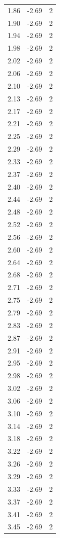 \begin{longtable}{lrr}
  1.86 & -2.69 & 2 \\
  1.90 & -2.69 & 2 \\
  1.94 & -2.69 & 2 \\
  1.98 & -2.69 & 2 \\
  2.02 & -2.69 & 2 \\
  2.06 & -2.69 & 2 \\
  2.10 & -2.69 & 2 \\
  2.13 & -2.69 & 2 \\
  2.17 & -2.69 & 2 \\
  2.21 & -2.69 & 2 \\
  2.25 & -2.69 & 2 \\
  2.29 & -2.69 & 2 \\
  2.33 & -2.69 & 2 \\
  2.37 & -2.69 & 2 \\
  2.40 & -2.69 & 2 \\
  2.44 & -2.69 & 2 \\
  2.48 & -2.69 & 2 \\
  2.52 & -2.69 & 2 \\
  2.56 & -2.69 & 2 \\
  2.60 & -2.69 & 2 \\
  2.64 & -2.69 & 2 \\
  2.68 & -2.69 & 2 \\
  2.71 & -2.69 & 2 \\
  2.75 & -2.69 & 2 \\
  2.79 & -2.69 & 2 \\
  2.83 & -2.69 & 2 \\
  2.87 & -2.69 & 2 \\
  2.91 & -2.69 & 2 \\
  2.95 & -2.69 & 2 \\
  2.98 & -2.69 & 2 \\
  3.02 & -2.69 & 2 \\
  3.06 & -2.69 & 2 \\
  3.10 & -2.69 & 2 \\
  3.14 & -2.69 & 2 \\
  3.18 & -2.69 & 2 \\
  3.22 & -2.69 & 2 \\
  3.26 & -2.69 & 2 \\
  3.29 & -2.69 & 2 \\
  3.33 & -2.69 & 2 \\
  3.37 & -2.69 & 2 \\
  3.41 & -2.69 & 2 \\
  3.45 & -2.69 & 2 \\

\end{longtable}
